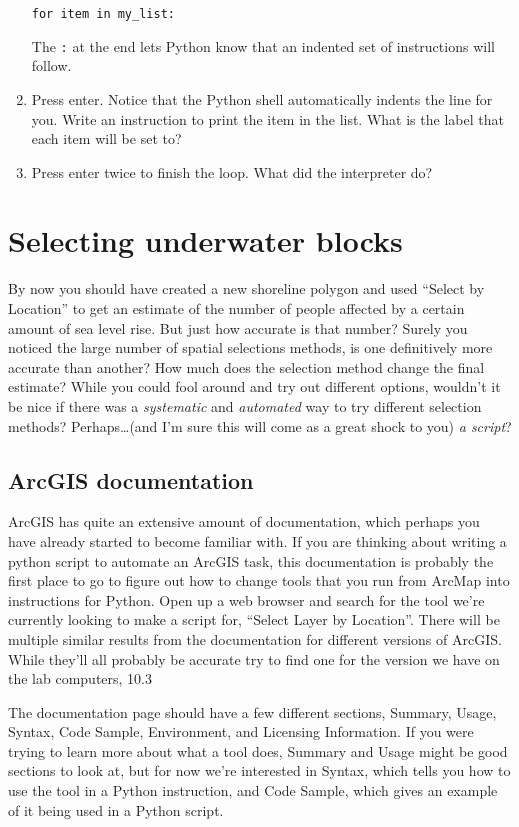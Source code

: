 \documentclass{article}
\begin{document}
\begin{enumerate}
        \texttt{for item in my\_list:}
    
        The \texttt{:} at the end lets Python know that an indented set of instructions will follow.
    \item Press enter.  Notice that the Python shell automatically indents the line for you.  Write an instruction to print the item in the list.  What is the label that each item will be set to?
    \item Press enter twice to finish the loop.  What did the interpreter do?\end{enumerate}

\section{Selecting underwater blocks}
By now you should have created a new shoreline polygon and used ``Select by Location'' to get an estimate of the number of people affected by a certain amount of sea level rise.  But just how accurate is that number?  Surely you noticed the large number of spatial selections methods, is one definitively more accurate than another?  How much does the selection method change the final estimate?  While you could fool around and try out different options, wouldn't it be nice if there was a \textit{systematic} and \textit{automated} way to try different selection methods?  Perhaps\ldots(and I'm sure this will come as a great shock to you) \textit{a script}?
\subsection{ArcGIS documentation}
ArcGIS has quite an extensive amount of documentation, which perhaps you have already started to become familiar with.  If you are thinking about writing a python script to automate an ArcGIS task, this documentation is probably the first place to go to figure out how to change tools that you run from ArcMap into instructions for Python.  Open up a web browser and search for the tool we're currently looking to make a script for, ``Select Layer by Location''.  There will be multiple similar results from the documentation for different versions of ArcGIS.  While they'll all probably be accurate try to find one for the version we have on the lab computers, 10.3

The documentation page should have a few different sections, Summary, Usage, Syntax, Code Sample, Environment, and Licensing Information.  If you were trying to learn more about what a tool does, Summary and Usage might be good sections to look at, but for now we're interested in Syntax, which tells you how to use the tool in a Python instruction, and Code Sample, which gives an example of it being used in a Python script.
\end{document}
